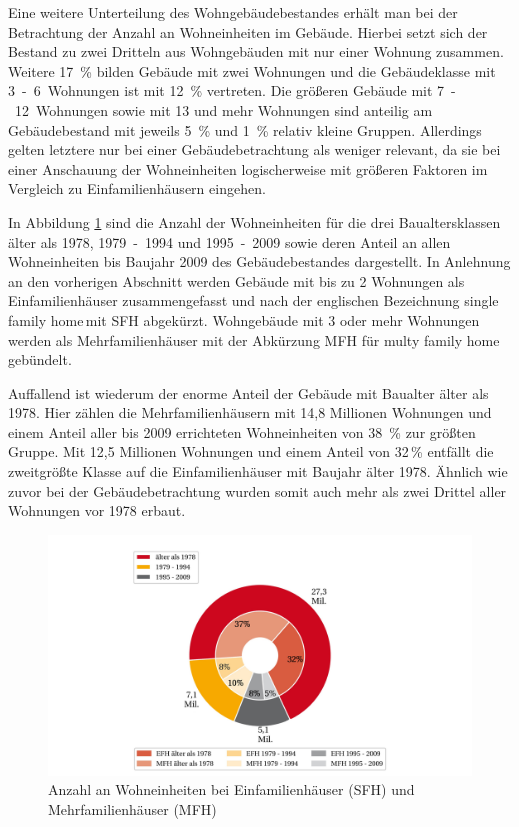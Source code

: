 Eine weitere Unterteilung des Wohngebäudebestandes erhält man bei der Betrachtung der Anzahl an Wohneinheiten im Gebäude. 
Hierbei setzt sich der Bestand zu zwei Dritteln aus Wohngebäuden mit nur einer Wohnung zusammen. 
Weitere \mbox{17 \%} bilden Gebäude mit zwei Wohnungen und die Gebäudeklasse mit \mbox{3 - 6 Wohnungen} ist mit \mbox{12 \%} vertreten. 
Die größeren Gebäude mit \mbox{7 - 12 Wohnungen} sowie mit 13 und mehr Wohnungen sind anteilig am Gebäudebestand mit jeweils \mbox{5 \%} und \mbox{1 \%} relativ kleine Gruppen. 
Allerdings gelten letztere nur bei einer Gebäudebetrachtung als weniger relevant, da sie bei einer Anschauung der Wohneinheiten logischerweise mit größeren Faktoren im Vergleich zu Einfamilienhäusern eingehen. \cite{StatistischeAmterdesBundesundderLander.2014b}

In Abbildung \ref{fig: Abbildung212} sind die Anzahl der Wohneinheiten für die drei Baualtersklassen älter als 1978, \mbox{1979 - 1994} und \mbox{1995 - 2009} sowie deren Anteil an allen Wohneinheiten bis Baujahr 2009 des Gebäudebestandes dargestellt. 
In Anlehnung an den vorherigen Abschnitt werden Gebäude mit bis zu 2 Wohnungen als Einfamilienhäuser zusammengefasst und nach der englischen Bezeichnung \glqq single family home\grqq\,mit SFH abgekürzt. 
Wohngebäude mit 3 oder mehr Wohnungen werden als Mehrfamilienhäuser mit der Abkürzung MFH für \glqq multy family home\grqq\,gebündelt. 

Auffallend ist wiederum der enorme Anteil der Gebäude mit Baualter älter als 1978. 
Hier zählen die Mehrfamilienhäusern mit 14,8 Millionen Wohnungen und einem Anteil aller bis 2009 errichteten Wohneinheiten von \mbox{38 \%} zur größten Gruppe. 
Mit 12,5 Millionen Wohnungen und einem Anteil von 32\,\% entfällt die zweitgrößte Klasse auf die Einfamilienhäuser mit Baujahr älter 1978.
Ähnlich wie zuvor bei der Gebäudebetrachtung wurden somit auch mehr als zwei Drittel aller Wohnungen vor 1978 erbaut.

\begin{figure}[H]
	\centering
		\includegraphics{Pictures/GebaeudeGroesse.jpg}
	\caption{Anzahl an Wohneinheiten bei Einfamilienhäuser (SFH) und Mehrfamilienhäuser (MFH) \cite{StatistischeAmterdesBundesundderLander.2014b}}
	\label{fig: Abbildung212} 
\end{figure}

